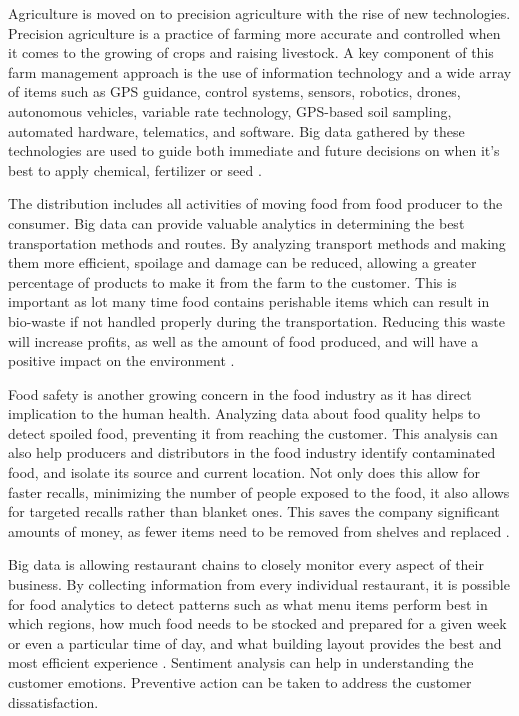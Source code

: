\documentclass[sigconf]{acmart}
\begin{document}
Agriculture is moved on to precision agriculture with the rise of new technologies. Precision agriculture is a practice of farming more accurate and controlled when it comes to the growing of crops and raising livestock.  A key component of this farm management approach is the use of information technology and a wide array of items such as GPS guidance, control systems, sensors, robotics, drones, autonomous vehicles, variable rate technology, GPS-based soil sampling, automated hardware, telematics, and software. Big data gathered by these technologies are used to guide both immediate and future decisions on when it’s best to apply chemical, fertilizer or seed \cite{remi}.

The distribution includes all activities of moving food from food producer to the consumer. Big data can provide valuable analytics in determining the best transportation methods and routes. By analyzing transport methods and making them more efficient, spoilage and damage can be reduced, allowing a greater percentage of products to make it from the farm to the customer. This is important as lot many time food contains perishable items which can result in bio-waste if not handled properly during the transportation. Reducing this waste will increase profits, as well as the amount of food produced, and will have a positive impact on the environment \cite{www-quantzig}.

Food safety is another growing concern in the food industry as it has direct implication to the human health. Analyzing data about food quality helps to detect spoiled food, preventing it from reaching the customer. This analysis can also help producers and distributors in the food industry identify contaminated food, and isolate its source and current location. Not only does this allow for faster recalls, minimizing the number of people exposed to the food, it also allows for targeted recalls rather than blanket ones. This saves the company significant amounts of money, as fewer items need to be removed from shelves and replaced \cite{www-quantzig}.

Big data is allowing restaurant chains to closely monitor every aspect of their business. By collecting information from every individual restaurant, it is possible for food analytics to detect patterns such as what menu items perform best in which regions, how much food needs to be stocked and prepared for a given week or even a particular time of day, and what building layout provides the best and most efficient experience \cite{www-quantzig}. Sentiment analysis can help in understanding the customer emotions. Preventive action can be taken to address the customer dissatisfaction. 
\end{document}

